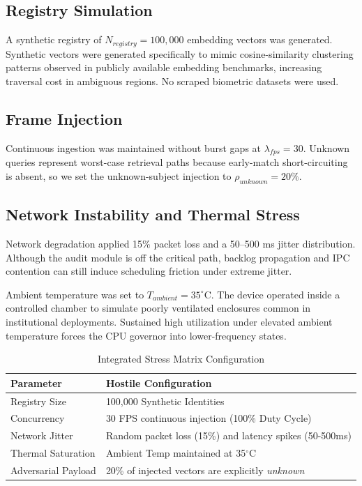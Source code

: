 \documentclass[conference]{IEEEtran}
\begin{document}
\subsection{Registry Simulation}
A synthetic registry of $N_{registry} = 100,000$ embedding vectors was generated. Synthetic vectors were generated specifically to mimic cosine-similarity clustering patterns observed in publicly available embedding benchmarks, increasing traversal cost in ambiguous regions. No scraped biometric datasets were used. 

\subsection{Frame Injection}
Continuous ingestion was maintained without burst gaps at $\lambda_{fps} = 30$. Unknown queries represent worst-case retrieval paths because early-match short-circuiting is absent, so we set the unknown-subject injection to $\rho_{unknown} = 20\%$.

\subsection{Network Instability and Thermal Stress}
Network degradation applied 15\% packet loss and a 50–500 ms jitter distribution. Although the audit module is off the critical path, backlog propagation and IPC contention can still induce scheduling friction under extreme jitter. 

Ambient temperature was set to $T_{ambient} = 35^\circ \text{C}$. The device operated inside a controlled chamber to simulate poorly ventilated enclosures common in institutional deployments. Sustained high utilization under elevated ambient temperature forces the CPU governor into lower-frequency states.

\begin{table}[htbp]
\caption{Integrated Stress Matrix Configuration}
\begin{center}
\begin{tabular}{l p{5.5cm}}
\toprule
\textbf{Parameter} & \textbf{Hostile Configuration} \\
\midrule
Registry Size & 100,000 Synthetic Identities \\
Concurrency & 30 FPS continuous injection (100\% Duty Cycle) \\
Network Jitter & Random packet loss (15\%) and latency spikes (50-500ms) \\
Thermal Saturation & Ambient Temp maintained at 35$^\circ$C \\
Adversarial Payload & 20\% of injected vectors are explicitly \textit{unknown} \\
\bottomrule
\end{tabular}
\end{center}
\label{tab:stress}
\end{table}
\end{document}
